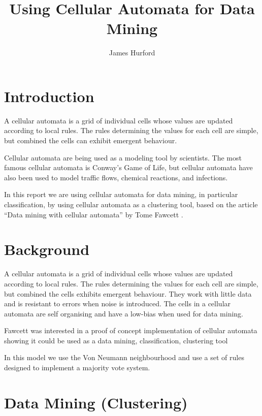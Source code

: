 \documentclass[11pt]{article}
\title{Using Cellular Automata for Data Mining}
\author{James Hurford}
\date{}
\begin{document}
\maketitle

\setcounter{tocdepth}{3}
\tableofcontents
\vspace*{1cm}


\section{Introduction}
\label{sec-1}

  A cellular automata is a grid of individual cells whose values are
  updated according to local rules. The rules determining the values
  for each cell are simple, but combined the cells can exhibit
  emergent behaviour. 

  Cellular automata are being used as a modeling tool by
  scientists. The most famous cellular automata is Conway's Game of
  Life, but cellular automata have also been used to model traffic
  flows, chemical reactions, and infections.

  In this report we are using cellular automata for data mining, in
  particular classification, by using cellular automata as a
  clustering tool, based on the article ``Data mining with cellular
  automata'' by Tome Fawcett \cite{fawcett08}.
\section{Background}
\label{sec-2}

  A cellular automata is a grid of individual cells whose values are
  updated according to local rules. The rules determining the values
  for each cell are simple, but combined the cells exhibits emergent
  behaviour.  They work with little data and is resistant to errors
  when noise is introduced.  The cells in a cellular automata are self
  organising and have a low-bias when used for data mining.

  Fawcett \cite{fawcett08} was interested in a proof of concept
  implementation of cellular automata showing it could be used as a
  data mining, classification, clustering tool

  In this model we use the Von Neumann neighbourhood and use a set of
  rules designed to implement a majority vote system.

  
\section{Data Mining (Clustering)}
\label{sec-3}
\end{document}
